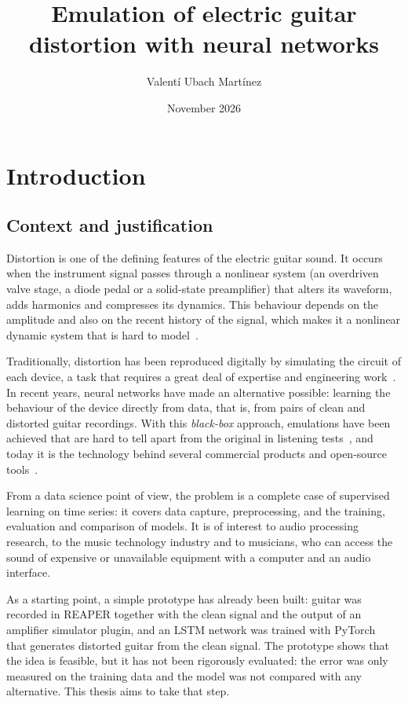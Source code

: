 \documentclass[ENG]{TFUOC}%
\title{Emulation of electric guitar distortion with neural networks}
\author{Valentí Ubach Martínez}
\date{November 2026}
\begin{document}
\estructura

\tableofcontents

\listoffigures

\listoftables

\chapter{Introduction}

\section{Context and justification}

Distortion is one of the defining features of the electric guitar sound. It occurs when the instrument signal passes through a nonlinear system (an overdriven valve stage, a diode pedal or a solid-state preamplifier) that alters its waveform, adds harmonics and compresses its dynamics. This behaviour depends on the amplitude and also on the recent history of the signal, which makes it a nonlinear dynamic system that is hard to model~\cite{pakarinen2009}.

Traditionally, distortion has been reproduced digitally by simulating the circuit of each device, a task that requires a great deal of expertise and engineering work~\cite{pakarinen2009,vanhatalo2022}. In recent years, neural networks have made an alternative possible: learning the behaviour of the device directly from data, that is, from pairs of clean and distorted guitar recordings. With this \emph{black-box} approach, emulations have been achieved that are hard to tell apart from the original in listening tests~\cite{wright2019,wright2020}, and today it is the technology behind several commercial products and open-source tools~\cite{nam}.

From a data science point of view, the problem is a complete case of supervised learning on time series: it covers data capture, preprocessing, and the training, evaluation and comparison of models. It is of interest to audio processing research, to the music technology industry and to musicians, who can access the sound of expensive or unavailable equipment with a computer and an audio interface.

As a starting point, a simple prototype has already been built: guitar was recorded in REAPER together with the clean signal and the output of an amplifier simulator plugin, and an LSTM network was trained with PyTorch~\cite{paszke2019} that generates distorted guitar from the clean signal. The prototype shows that the idea is feasible, but it has not been rigorously evaluated: the error was only measured on the training data and the model was not compared with any alternative. This thesis aims to take that step.
\end{document}
